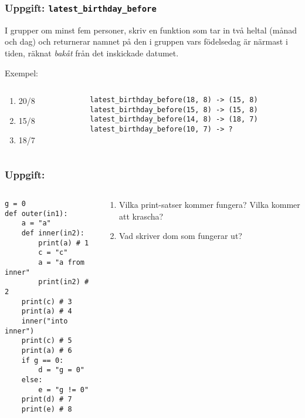 \documentclass{beamer}
\begin{document}
  \begin{frame}
    \frametitle{Uppgift: \texttt{latest\_birthday\_before}}

    I grupper om minst fem personer, skriv en funktion som tar in två heltal
    (månad och dag) och returnerar namnet på den i gruppen vars födelsedag är
    närmast i tiden, räknat \emph{bakåt} från det inskickade datumet.

    \pause
    \vspace{1em}

    Exempel:

    \begin{columns}[T]
      \begin{column}{0.2\textwidth}
        \begin{enumerate}
          \item 20/8
          \item 15/8
          \item 18/7
        \end{enumerate}
      \end{column}%
      \begin{column}{0.78\textwidth}
        \texttt{latest\_birthday\_before(18, 8) -> (15, 8)}\\
        \texttt{latest\_birthday\_before(15, 8) -> (15, 8)}\\
        \texttt{latest\_birthday\_before(14, 8) -> (18, 7)}\\
        \pause
        \texttt{latest\_birthday\_before(10, 7) -> ?}
      \end{column}%
    \end{columns}
  \end{frame}

  \begin{frame}[fragile]
    \frametitle{Uppgift: }
    \begin{columns}
      \begin{column}{0.48\textwidth}
        \begin{verbatim}
g = 0
def outer(in1):
    a = "a"
    def inner(in2):
        print(a) # 1
        c = "c"
        a = "a from inner"
        print(in2) # 2
    print(c) # 3
    print(a) # 4
    inner("into inner")
    print(c) # 5
    print(a) # 6
    if g == 0:
        d = "g = 0"
    else:
        e = "g != 0"
    print(d) # 7
    print(e) # 8
        \end{verbatim}
      \end{column}%
      \begin{column}{0.48\textwidth}
        \begin{enumerate}
          \item Vilka print-satser kommer fungera? Vilka kommer att krascha?
          \item Vad skriver dom som fungerar ut?
        \end{enumerate}
      \end{column}%
    \end{columns}
  \end{frame}
\end{document}
